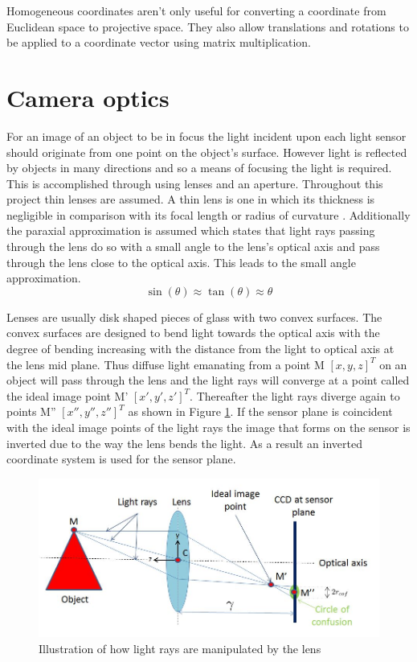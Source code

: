 \documentclass[12pt,oneside,openany,a4paper, %
english, %
masters-t, goldenblock]{usthesis}
\begin{document}
Homogeneous coordinates aren't only useful for converting a coordinate from Euclidean space to projective space. They also allow translations and rotations to be applied to a coordinate vector using matrix multiplication. %

\section{Camera optics}
For an image of an object to be in focus the light incident upon each light sensor should originate from one point on the object's surface. However light is reflected by objects in many directions and so a means of focusing the light is required. This is accomplished through using lenses and an aperture. Throughout this project thin lenses are assumed. A thin lens is one in which its thickness is negligible in comparison with its focal length or radius of curvature \cite{sutton2009image}. Additionally the paraxial approximation is assumed which states that light rays passing through the lens do so with a small angle to the lens's optical axis and pass through the lens close to the optical axis. This leads to the small angle approximation.
\begin{equation}
  \sin(\theta) \approx \tan(\theta) \approx \theta
\end{equation}

Lenses are usually disk shaped pieces of glass with two convex surfaces. The convex surfaces are designed to bend light towards the optical axis with the degree of bending increasing with the distance from the light to optical axis at the lens mid plane. Thus diffuse light emanating from a point M $[x,y,z]^T$ on an object will pass through the lens and the light rays will converge at a point called the ideal image point M' $[x',y',z']^T$. Thereafter the light rays diverge again to points M'' $[x'', y'', z'']^T$ as shown in Figure \ref{fig:optics}. If the sensor plane is coincident with the ideal image points of the light rays the image that forms on the sensor is inverted due to the way the lens bends the light. As a result an inverted coordinate system is used for the sensor plane.

\begin{figure}[h]
    \centering
    \includegraphics[scale=0.6]{Optics}
    \caption{Illustration of how light rays are manipulated by the lens}
    \label{fig:optics}
\end{figure}
\end{document}
